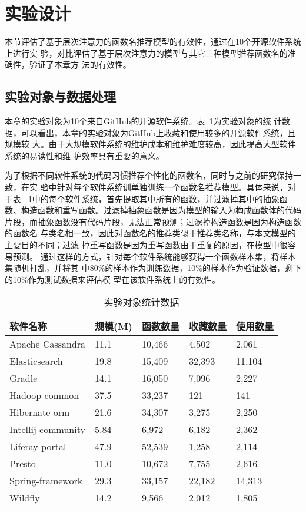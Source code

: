 \section{实验设计}
本节评估了基于层次注意力的函数名推荐模型的有效性，通过在10个开源软件系统上进行实
验，对比评估了基于层次注意力的模型与其它三种模型推荐函数名的准确性，验证了本章方
法的有效性。

\subsection{实验对象与数据处理}
本章的实验对象为10个来自GitHub的开源软件系统。表~\ref{benchmark3}为实验对象的统
计数据，可以看出，本章的实验对象为GitHub上收藏和使用较多的开源软件系统，且规模较
大。由于大规模软件系统的维护成本和维护难度较高，因此提高大型软件系统的易读性和维
护效率具有重要的意义。


为了根据不同软件系统的代码习惯推荐个性化的函数名，同时与之前的研究保持一致，在实
验中针对每个软件系统训单独训练一个函数名推荐模型。具体来说，对于表
~\ref{benchmark3}中的每个软件系统，首先提取其中所有的函数，并过滤掉其中的抽象函
数、构造函数和重写函数。过滤掉抽象函数是因为模型的输入为构成函数体的代码
片段，而抽象函数没有代码片段，无法正常预测；过滤掉构造函数是因为构造函数的函数名
与类名相一致，因此对函数名的推荐类似于推荐类名称，与本文模型的主要目的不同；过滤
掉重写函数是因为重写函数由于重复的原因，在模型中很容易预测。
通过这样的方式，针对每个软件系统能够获得一个函数样本集，将样本集随机打乱，并将其
中80\%的样本作为训练数据，10\%的样本作为验证数据，剩下的10\%作为测试数据来评估模
型在该软件系统上的有效性。

\begin{table}[!t]
\zihaowu
\renewcommand{\arraystretch}{1.4}
\caption{实验对象统计数据}
\label{benchmark3}
\centering
\begin{tabular}{l@{\quad}l@{\quad}l@{\quad}l@{\quad}l}
\toprule 
软件名称 &规模(M) &函数数量 &收藏数量 &使用数量\\ 
\midrule
Apache Cassandra &11.1 &10,466 &4,502 &2,061\\ 
Elasticsearch &19.8 &15,409 &32,393 &11,104\\ 
Gradle &14.1 &16,050 &7,096 &2,227\\ 
Hadoop-common &37.5 &33,237 &121 &141\\ 
Hibernate-orm &21.6 &34,307 &3,275 &2,250\\ 
Intellij-community &5.84 &6,972 &6,182 &2,362\\ 
Liferay-portal &47.9 &52,539 &1,258 &2,114\\ 
Presto &11.0 &10,672 &7,755 &2,616\\ 
Spring-framework &29.3 &33,157 &22,182 &14,313\\ 
Wildfly &14.2 &9,566 &2,012 &1,805\\ 
\bottomrule
\end{tabular}
\end{table}

